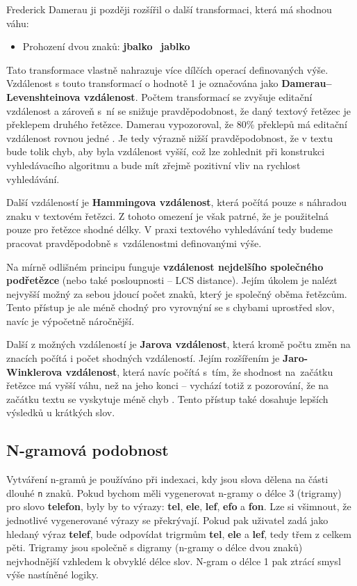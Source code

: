 \documentclass[FM,DP]{tulthesis}
\begin{document}
Frederick Damerau ji později rozšířil o další transformaci, která má shodnou váhu:

\begin{itemize}
\item Prohození dvou znaků: \textbf{jbalko} \textrightarrow ~\textbf{jablko}
\end{itemize}

Tato transformace vlastně nahrazuje více dílčích operací definovaných výše. 
Vzdálenost s touto transformací o hodnotě 1 je označována jako 
\textbf{Damerau–Levenshteinova vzdálenost}. 
Počtem transformací se zvyšuje editační vzdálenost a zároveň
s~ní se snižuje pravděpodobnost, že daný textový řetězec je překlepem
druhého řetězce. Damerau vypozoroval, že 80\% překlepů má editační vzdálenost 
rovnou jedné \cite{damerau}. Je tedy výrazně nižší pravděpodobnost, že 
v textu bude tolik chyb, aby byla vzdálenost vyšší, což lze zohlednit při konstrukci
vyhledávacího algoritmu a bude mít zřejmě pozitivní vliv na rychlost vyhledávání.

Další vzdáleností je \textbf{Hammingova vzdálenost}, která počítá pouze s náhradou
znaku v textovém řetězci. Z tohoto omezení je však patrné, že je použitelná pouze pro 
řetězce shodné délky. V praxi textového vyhledávání tedy budeme pracovat pravděpodobně
s~vzdálenostmi definovanými výše.

Na mírně odlišném principu funguje \textbf{vzdálenost nejdelšího společného podřetězce}
(nebo také posloupnosti -- LCS distance). Jejím úkolem je nalézt nejvyšší možný za sebou
jdoucí počet znaků, který je společný oběma řetězcům. Tento přístup je ale méně
chodný pro vyrovnýní se s chybami uprostřed slov, navíc je výpočetně náročnější.

Další z možných vzdáleností je \textbf{Jarova vzdálenost}, která kromě počtu
změn na znacích počítá i počet shodných vzdáleností. Jejím rozšířením je
\textbf{Jaro-Winklerova vzdálenost}, která navíc počítá s~tím, že shodnost 
na~začátku řetězce má vyšší váhu, než na jeho konci -- vychází
totiž z pozorování, že na začátku textu se vyskytuje méně chyb \cite{christen}.
Tento přístup také dosahuje lepších výsledků u krátkých slov.

\subsection{N-gramová podobnost}

Vytváření n-gramů je používáno při indexaci, kdy jsou slova dělena na části dlouhé \verb|n| znaků.
Pokud bychom měli vygenerovat n-gramy o délce 3 (trigramy) pro slovo \textbf{telefon}, byly by 
to výrazy: \textbf{tel}, \textbf{ele}, \textbf{lef}, \textbf{efo} a \textbf{fon}. Lze si 
všimnout, že jednotlivé vygenerované výrazy se překrývají. Pokud pak uživatel zadá jako hledaný 
výraz \textbf{telef}, bude odpovídat trigrmům \textbf{tel}, \textbf{ele} a \textbf{lef}, 
tedy třem z celkem pěti. Trigramy jsou společně s digramy (n-gramy o délce dvou znaků) nejvhodnější
vzhledem k obvyklé délce slov. N-gram o délce 1 pak ztrácí smysl výše nastíněné logiky.
\end{document}
